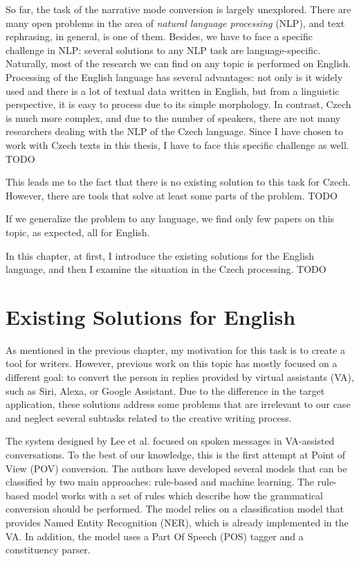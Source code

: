 So far, the task of the narrative mode conversion is largely unexplored. There are many open problems in the area of \emph{natural language processing} (NLP), and text rephrasing, in general, is one of them. Besides, we have to face a specific challenge in NLP: several solutions to any NLP task are language-specific. Naturally, most of the research we can find on any topic is performed on English. Processing of the English language has several advantages: not only is it widely used and there is a lot of textual data written in English, but from a linguistic perspective, it is easy to process due to its simple morphology. In contrast, Czech is much more complex, and due to the number of speakers, there are not many researchers dealing with the NLP  of the Czech language. Since I have chosen to work with Czech texts in this thesis, I have to face this specific challenge as well. TODO

This leads me to the fact that there is no existing solution to this task for Czech. However, there are tools that solve at least some parts of the problem. TODO

If we generalize the problem to any language, we find only few papers on this topic, as expected, all for English.

In this chapter, at first, I introduce the existing solutions for the English language, and then I examine the situation in the Czech processing. TODO

\section{Existing Solutions for English}

As mentioned in the previous chapter, my motivation for this task is to create a tool for writers. However, previous work on this topic has mostly focused on a different goal: to convert the person in replies provided by virtual assistants (VA), such as Siri, Alexa, or Google Assistant. Due to the difference in the target application, these solutions address some problems that are irrelevant to our case and neglect several subtasks related to the creative writing process.

The system designed by Lee et al. \cite{lee2020converting} focused on spoken messages in VA-assisted conversations. To the best of our knowledge, this is the first attempt at Point of View (POV) conversion. The authors have developed several models that can be classified by two main approaches: rule-based and machine learning. The rule-based model works with a set of rules which describe how the grammatical conversion should be performed. The model relies on a classification model that provides Named Entity Recognition (NER), which is already implemented in the VA. In addition, the model uses a Part Of Speech (POS) tagger and a constituency parser.

